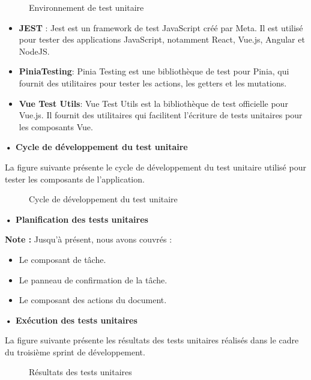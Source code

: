 \begin{figure}[H]
  \centering
  \caption{Environnement de test unitaire}
  \label{fig:environnementdetestunitaire}
\end{figure}
\begin{itemize}
  \item \textbf{JEST} : Jest est un framework de test JavaScript créé par Meta. Il est utilisé pour tester des applications JavaScript, notamment React, Vue.js, Angular et NodeJS.
  \item \textbf{PiniaTesting}: Pinia Testing est une bibliothèque de test pour Pinia, qui fournit des utilitaires pour tester les actions, les getters et les mutations.
  \item \textbf{Vue Test Utils}: Vue Test Utils est la bibliothèque de test officielle pour Vue.js. Il fournit des utilitaires qui facilitent l'écriture de tests unitaires pour les composants Vue.
\end{itemize}


\textbf{•	Cycle de développement du test unitaire}

La figure suivante présente le cycle de développement du test unitaire utilisé pour tester les composants de l'application.

\begin{figure}[H]
  \centering
  \caption{Cycle de développement du test unitaire}
  \label{fig:cyclededveloppementdutestunitaire}
\end{figure}

\textbf{•	Planification des tests unitaires}

\textbf{Note : } Jusqu'à présent, nous avons couvrés :
\begin{itemize}
  \item Le composant de tâche.
  \item Le panneau de confirmation de la tâche.
  \item Le composant des actions du document.
\end{itemize}

\textbf{•	Exécution des tests unitaires}

La figure suivante présente les résultats des tests unitaires réalisés dans le cadre du troisième sprint de développement.

\begin{figure}[H]
  \centering
  \caption{Résultats des tests unitaires}
  \label{fig:resultatstestunitaire}
\end{figure}

